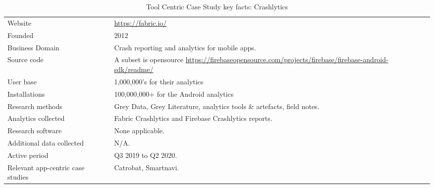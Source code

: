 {\renewcommand{\arraystretch}{0.8}%
\begin{table*}[htbp!]
    \centering
    \small
    \setlength{\tabcolsep}{6pt}
    \begin{tabular}{lp{9cm}}
       \toprule
       Website &\url{https://fabric.io/} \\
       Founded & 2012 \\
       Business Domain & Crash reporting and analytics for mobile apps. \\
       Source code  & A subset is opensource \url{https://firebaseopensource.com/projects/firebase/firebase-android-sdk/readme/} \\
       \midrule
       User base & 1,000,000's for their analytics\footnotemark \\ %
       Installations & 100,000,000+ for the Android analytics \\ %
       \midrule
       Research methods &Grey Data, Grey Literature, analytics tools \& artefacts, field notes. \\
       Analytics collected &Fabric Crashlytics and Firebase Crashlytics reports. \\
       Research software & None applicable. \\
       Additional data collected &N/A. \\
       Active period & Q3 2019 to Q2 2020. \\
       Relevant app-centric case studies & Catrobat, Smartnavi. \\
       \bottomrule
    \end{tabular}
    \caption{Tool Centric Case Study key facts: Crashlytics}
    \label{tab:blank_case_study_anaytics_overview}
\end{table*}
}



